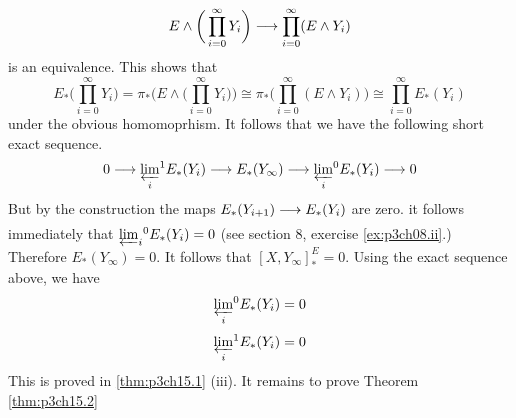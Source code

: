 \documentclass[../main]{subfiles}
\begin{document}
\[E\wedge\bigg(\prod_{i=0}^\infty Y_i \bigg)\lar{}\prod_{i=0}^\infty (E\wedge Y_i) \]
is an equivalence. This shows that \[E_\ast\bigg(\prod_{i=0}^\infty Y_i \bigg)= \pi_\ast\bigg(E\wedge \bigg(\prod_{i=0}^\infty Y_i \bigg)\bigg) \cong \pi_\ast\bigg(\prod_{i=0}^\infty (E\wedge Y_i) \bigg)\cong \prod_{i=0}^\infty E_\ast(Y_i)\]
under the obvious homomoprhism. It follows that we have the following short exact sequence.
\[0\lar{} \varprojlim_i\!^1E_\ast(Y_i) \lar{} E_\ast(Y_\infty)\lar{}\varprojlim_i\!^0 E_\ast(Y_i)\lar{} 0\]
But by the construction the maps $E_\ast(Y_{i+1})\lar{} E_\ast (Y_i)$ are zero. it follows immediately that $\varprojlim_i\!^0 E_\ast(Y_i)=0$ (see section 8, exercise \ref{ex:p3ch08.ii}.) Therefore $E_\ast(Y_\infty)=0$. It follows that $[X,Y_\infty]_\ast^E=0$. Using the exact sequence above, we have \[\varprojlim_i\!^0E_\ast(Y_i) =0\] \[\varprojlim_i\!^1E_\ast(Y_i)=0 \]
This is proved in \ref{thm:p3ch15.1} (iii). It remains to prove Theorem \ref{thm:p3ch15.2}
\end{document}
